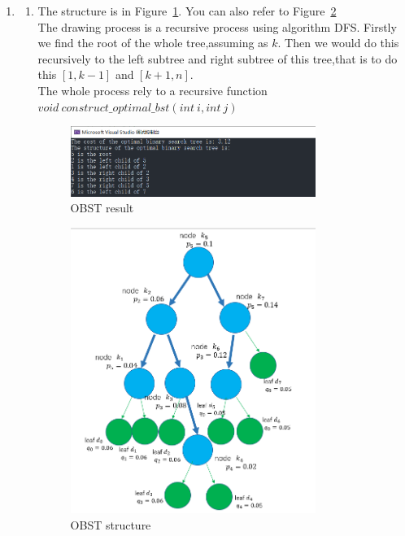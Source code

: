 \documentclass[12pt,a4paper]{article}
\makeatletter
\newtheorem*{solution}{Solution}
\theoremstyle{definition}
\renewenvironment{solution}[1][Solution] {\par\pushQED{\qed}\normalfont\topsep6\p@\@plus6\p@\relax\trivlist\item[\hskip\labelsep\bfseries#1\@addpunct{.}]\ignorespaces}{\popQED\endtrivlist\@endpefalse} \makeatother
\makeatother
\begin{document}
\begin{enumerate}
\begin{solution}
\begin{enumerate}
        \item
        The structure is in Figure~\ref{OBST}. You can also refer to Figure~\ref{OBST1}\\
        The drawing process is a recursive process using algorithm DFS. Firstly we find the root of the whole tree,assuming as $k$. Then we would do this recursively to the left subtree and right subtree of this tree,that is to do this $[1,k-1]$ and $[k+1,n]$.\\
        The whole process rely to a recursive function $void~construct\_optimal\_bst(int~i, int~j)$
        \begin{figure}[htbp]
        \centering
        \includegraphics[width=0.8\textwidth]{OBST.png}
        \caption{OBST result}\label{OBST}
        \end{figure}
        \begin{figure}[htbp]
        \centering
        \includegraphics[width=0.8\textwidth]{OBST1.png}
        \caption{OBST structure}\label{OBST1}
        \end{figure}
		\end{enumerate}
		\end{solution}
		

\end{enumerate}
\end{document}
